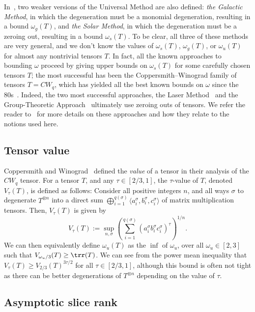 \documentclass{toc}
\begin{document}
In~\cite{aw}, two weaker versions of the Universal Method are also defined: \emph{the Galactic Method}, in which the degeneration must be a monomial degeneration, resulting in a bound $\omega_g(T)$, and \emph{the Solar Method}, in which the degeneration must be a zeroing out, resulting in a bound $\omega_s(T)$. To be clear, all three of these methods are very general, and we don't know the values of $\omega_s(T)$, $\omega_g(T)$, or $\omega_u(T)$ for almost any nontrivial tensors $T$. In fact, all the known approaches to bounding $\omega$ proceed by giving upper bounds on $\omega_s(T)$ for some carefully chosen tensors $T$; the most successful has been the Coppersmith--Winograd family of tensors $T = CW_q$, which has yielded all the best known bounds on $\omega$ 
%
%
%
since the 80s~\cite{CoppersmithW82,stothers,v12,legall,awrefined}. 
Indeed, the two most successful approaches, the Laser Method~\cite{strassenlaser1} and the Group-Theoretic Approach~\cite{cohn2003group} ultimately use zeroing outs of tensors. We refer the reader to~\cite[Sections 3.3 and 3.4]{aw} for more details on these approaches and how they relate to the notions used here.




%
\subsection{Tensor value} \label{subsec:value}

Coppersmith and Winograd~\cite{coppersmith} defined the \emph{value} of a tensor in their analysis of the $CW_q$ tensor. For a tensor $T$, and any $\tau \in [2/3, 1]$, the $\tau$-value of $T$, denoted $V_\tau(T)$, is defined as follows: Consider all positive integers $n$, and all ways $\sigma$ to degenerate $T^{\otimes n}$ into a direct sum $\bigoplus_{i=1}^{q(\sigma)} \langle a_i^\sigma, b_i^\sigma, c_i^\sigma \rangle$ of matrix multiplication tensors. Then, $V_\tau(T)$ is given by $$V_\tau(T) := \sup_{n, \sigma} \left( \sum_{i=1}^{q(\sigma)} (a_i^\sigma b_i^\sigma c_i^\sigma)^\tau \right)^{1/n}.$$
We can then equivalently define $\omega_u(T)$ as the $\inf$ of $\omega_u$, over all $\omega_u \in [2,3]$ such that $V_{\omega_u / 3}(T) \geq \trr(T)$. We can see from the power mean inequality that $V_\tau(T) \geq V_{2/3}(T)^{3 \tau / 2}$ for all $\tau \in [2/3,1]$, although this bound is often not tight as there can be better degenerations of $T^{\otimes n}$ depending on the value of $\tau$.



%
\subsection{Asymptotic slice rank} \label{sliceranksubsec}
\end{document}
